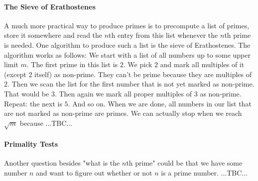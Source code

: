 
\paragraph{The Sieve of Erathostenes}
A much more practical way to produce primes is to precompute a list of primes, store it somewhere and read the $n$th entry from this list whenever the $n$th prime is needed. One algorithm to produce such a list is the sieve of Erathostenes. The algorithm works as follows: We start with a list of all numbers up to some upper limit $m$. The first prime in this list is $2$. We pick $2$ and mark all multiples of it (except $2$ itself) as non-prime. They can't be prime because they are multiples of $2$. Then we scan the list for the first number that is not yet marked as non-prime. That would be $3$. Then again we  mark all proper multiples of $3$ as non-prime. Repeat: the next is $5$. And so on. When we are done, all numbers in our list that are not marked as non-prime are primes. We can actually stop when we reach $\sqrt{m}$ because ...TBC...



\paragraph{Primality Tests}
Another question besides "what is the $n$th prime" could be that we have some number $n$ and want to figure out whether or not $n$ is a prime number. ...TBC...





